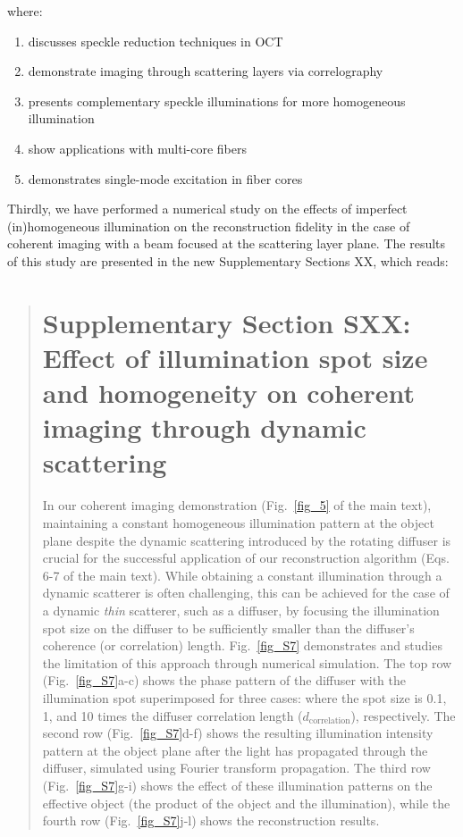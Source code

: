 \documentclass[12pt]{article}
\newenvironment{ourresponse}
    {\begin{tcolorbox}[width=\linewidth,breakable,enhanced,colback=gray!5,colframe=responsecolor!50,title=Response,left=5pt,right=5pt]}
    {\end{tcolorbox}}
\begin{document}
\begin{ourresponse}
where:
\begin{enumerate}
    \item \cite{liba2017speckle} discusses speckle reduction techniques in OCT
    \item \cite{idell1987image, salhov2018depth, metzler2020deepinverse} demonstrate imaging through scattering layers via correlography
    \item \cite{gateau2017complementary} presents complementary speckle illuminations for more homogeneous illumination
    \item \cite{choi2022flexible, haim2025image} show applications with multi-core fibers
    \item \cite{weinberg2024ptychographic} demonstrates single-mode excitation in fiber cores

\end{enumerate}
Thirdly, we have performed a numerical study on the effects of imperfect (in)homogeneous illumination on the reconstruction fidelity in the case of coherent imaging with a beam focused at the scattering layer plane.
The results of this study are presented in the new Supplementary Sections XX, which reads:

    \begin{quote}
    \section*{Supplementary Section SXX: Effect of illumination spot size and homogeneity on coherent imaging through dynamic scattering}

In our coherent imaging demonstration (Fig.~\ref{fig_5} of the main text), maintaining a constant homogeneous illumination pattern at the object plane despite the dynamic scattering introduced by the rotating diffuser is crucial for the successful application of our reconstruction algorithm (Eqs. 6-7 of the main text). %
While obtaining a constant illumination through a dynamic scatterer is often challenging, this can be achieved for the case of a dynamic \textit{thin} scatterer, such as a diffuser, by focusing the illumination spot size on the diffuser to be sufficiently smaller than the diffuser's coherence (or correlation) length.
Fig.~\ref{fig_S7} demonstrates and studies the limitation of this approach through numerical simulation. The top row (Fig.~\ref{fig_S7}a-c) shows the phase pattern of the diffuser with the illumination spot superimposed for three cases: where the spot size is 0.1, 1, and 10 times the diffuser correlation length ($d_{\text{correlation}}$), respectively. The second row (Fig.~\ref{fig_S7}d-f) shows the resulting illumination intensity pattern at the object plane after the light has propagated through the diffuser, simulated using Fourier transform propagation.
The third row (Fig.~\ref{fig_S7}g-i) shows the effect of these illumination patterns on the effective object (the product of the object and the illumination), while the fourth row (Fig.~\ref{fig_S7}j-l) shows the reconstruction results. 





\end{quote}
\end{ourresponse}
\end{document}
